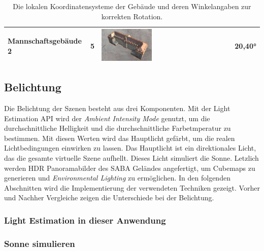 \begin{table}[H]
\begin{tabular}{|p{}|p{}|p{}|p{}|}
        Mannschaftsgebäude 2    & 5   & \parbox[c]{0.4\textwidth}{\includegraphics[width=0.4\textwidth]{img/anwendung/technisch/gps/konzeption-lokales-koordinatensystem-l4.jpg}}                                      & 20,40°       \\ \hline
    \end{tabular}
    \caption{Die lokalen Koordinatensysteme der Gebäude und deren Winkelangaben zur korrekten Rotation.}
    \label{tab:umsetzung-gps-berechnete-winkel}
\end{table}


\subsection{Belichtung}
\label{technische-umsetzung-licht}
Die Belichtung der Szenen besteht aus drei Komponenten. Mit der Light Estimation API wird der \textit{Ambient Intensity Mode} genutzt, um die durchschnittliche Helligkeit und die durchschnittliche Farbetmperatur zu bestimmen. Mit diesen Werten wird das Hauptlicht gefärbt, um die realen Lichtbedingungen einwirken zu lassen. Das Hauptlicht ist ein direktionales Licht, das die gesamte virtuelle Szene aufhellt. Dieses Licht simuliert die Sonne. Letzlich werden HDR Panoramabilder des SABA Geländes angefertigt, um Cubemaps zu generieren und \textit{Environmental Lighting} zu ermöglichen. In den folgenden Abschnitten wird die Implementierung der verwendeten Techniken gezeigt. Vorher und Nachher Vergleiche zeigen die Unterschiede bei der Belichtung.

\subsubsection{Light Estimation in dieser Anwendung}
\label{technische-umsetzung-light-estimation}



\subsubsection{Sonne simulieren}

